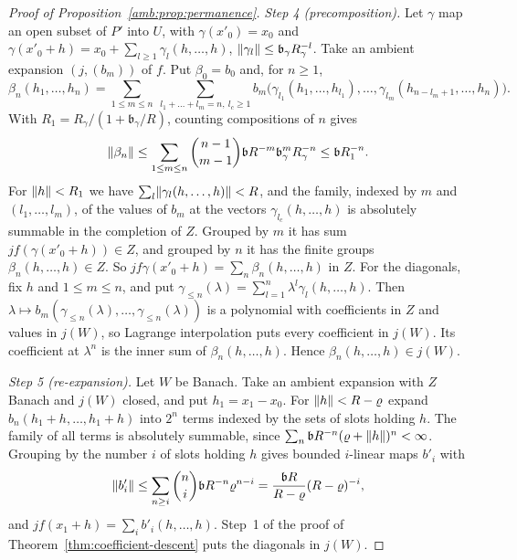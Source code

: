 \begin{proof}[Proof of Proposition~\ref{amb:prop:permanence}]
\emph{Step 4 (precomposition).} Let $\gamma$ map an open subset of $P'$ into $U$, with $\gamma(x'_0)=x_0$ and $\gamma(x'_0+h)=x_0+\sum_{l\ge1}\gamma_l(h,\dots,h)$, $\lVert \gamma_l\rVert\le \mathfrak b_\gamma R_\gamma^{-l}$. Take an ambient expansion $(j,(b_m))$ of $f$. Put $\beta_0=b_0$ and, for $n\ge1$,
\[
 \beta_n(h_1,\dots,h_n)=\sum_{1\le m\le n}\ \sum_{l_1+\dots+l_m=n,\ l_c\ge1}b_m\bigl(\gamma_{l_1}(h_1,\dots,h_{l_1}),\dots,\gamma_{l_m}(h_{n-l_m+1},\dots,h_n)\bigr).
\]
With $R_1=R_\gamma/(1+\mathfrak b_\gamma/R)$, counting compositions of $n$ gives
\[
 \lVert \beta_n\rVert\le\sum_{1\le m\le n}\binom{n-1}{m-1}\mathfrak bR^{-m}\mathfrak b_\gamma^mR_\gamma^{-n}\le \mathfrak bR_1^{-n}.
\]
For $\lVert h\rVert<R_1$ we have $\sum_l\lVert \gamma_l(h,\dots,h)\rVert<R$, and the family, indexed by $m$ and $(l_1,\dots,l_m)$, of the values of $b_m$ at the vectors $\gamma_{l_c}(h,\dots,h)$ is absolutely summable in the completion of $Z$. Grouped by $m$ it has sum $jf(\gamma(x'_0+h))\in Z$, and grouped by $n$ it has the finite groups $\beta_n(h,\dots,h)\in Z$. So $jf\gamma(x'_0+h)=\sum_n\beta_n(h,\dots,h)$ in $Z$. For the diagonals, fix $h$ and $1\le m\le n$, and put $\gamma_{\le n}(\lambda)=\sum_{l=1}^n\lambda^l\gamma_l(h,\dots,h)$. Then $\lambda\mapsto b_m(\gamma_{\le n}(\lambda),\dots,\gamma_{\le n}(\lambda))$ is a polynomial with coefficients in $Z$ and values in $j(W)$, so Lagrange interpolation puts every coefficient in $j(W)$. Its coefficient at $\lambda^n$ is the inner sum of $\beta_n(h,\dots,h)$. Hence $\beta_n(h,\dots,h)\in j(W)$.

\emph{Step 5 (re-expansion).} Let $W$ be Banach. Take an ambient expansion with $Z$ Banach and $j(W)$ closed, and put $h_1=x_1-x_0$. For $\lVert h\rVert<R-\varrho$ expand $b_n(h_1+h,\dots,h_1+h)$ into $2^n$ terms indexed by the sets of slots holding $h$. The family of all terms is absolutely summable, since $\sum_n\mathfrak bR^{-n}(\varrho+\lVert h\rVert)^n<\infty$. Grouping by the number $i$ of slots holding $h$ gives bounded $i$\nobreakdash-linear maps $b'_i$ with
\[
 \lVert b'_i\rVert\le\sum_{n\ge i}\binom ni\mathfrak bR^{-n}\varrho^{n-i}=\frac{\mathfrak bR}{R-\varrho}(R-\varrho)^{-i},
\]
and $jf(x_1+h)=\sum_ib'_i(h,\dots,h)$. Step~1 of the proof of Theorem~\ref{thm:coefficient-descent} puts the diagonals in $j(W)$.


\end{proof}
